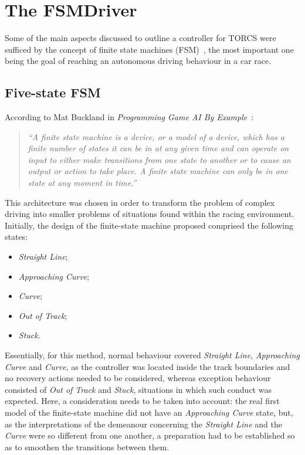 \section{\textbf{The FSMDriver}} \label{sec:FSM}
	
	Some of the main aspects discussed to outline a controller for TORCS were sufficed by the concept of finite state
	machines (FSM)~\cite{Millington:2006:FSM}, the most important one being the goal of reaching an autonomous driving
	behaviour in a car race.
	
\subsection{Five-state FSM} \label{subsec:FSM5}
	
	According to Mat Buckland in \emph{Programming Game AI By Example}~\cite{Buckland:2005:AI}:
	
	\begin{quotation}
		
		\emph{
		``A finite state machine is a device, or a model of a device, which has a finite number of states it can be in
		at any given time and can operate on input to either make transitions from one state to another or to cause
		an output or action to take place. A finite state machine can only be in one state at any moment in time.''}
		
	\end{quotation}
	
	This architecture was chosen in order to transform the problem of complex driving into smaller problems of
	situations found within the racing environment. Initially, the design of the finite-state machine proposed
	comprised the following states:
	
	\begin{itemize}

	\item \emph{Straight Line};
	
	\item \emph{Approaching Curve};
	
	\item \emph{Curve};
	
	\item \emph{Out of Track};
	
	\item \emph{Stuck}.

	\end{itemize}
	
	Essentially, for this method, normal behaviour covered \emph{Straight Line}, \emph{Approaching Curve} and
	\emph{Curve}, as the controller was located inside the track boundaries and no recovery actions needed to be
	considered, whereas exception behaviour consisted of \emph{Out of Track} and \emph{Stuck}, situations in which
	such conduct was expected. Here, a consideration needs to be taken into account: the real first model of the
	finite-state machine did not have an \emph{Approaching Curve} state, but, as the interpretations of the demeanour
	concerning the \emph{Straight Line} and the \emph{Curve} were so different from one another, a preparation had to
	be established so as to smoothen the transitions between them.
	
